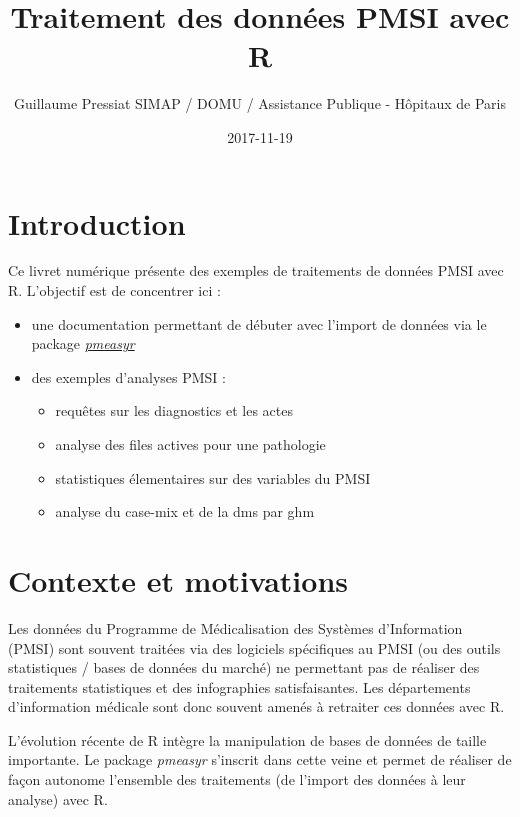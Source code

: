 \documentclass[]{book}
\title{Traitement des données PMSI avec R}
\author{Guillaume Pressiat \textbar{}\textbar{} SIMAP / DOMU / Assistance
Publique - Hôpitaux de Paris}
\date{2017-11-19}
\providecommand{\tightlist}{%
  \setlength{\itemsep}{0pt}\setlength{\parskip}{0pt}}
\theoremstyle{definition}
\theoremstyle{definition}
\theoremstyle{definition}
\theoremstyle{remark}
\begin{document}
\maketitle

{
\setcounter{tocdepth}{1}
\tableofcontents
}
\chapter{Introduction}\label{introduction}

Ce livret numérique présente des exemples de traitements de données PMSI
avec R. L'objectif est de concentrer ici :

\begin{itemize}
\item
  une documentation permettant de débuter avec l'import de données via
  le package \href{https://github.com/IM-APHP/pmeasyr}{\emph{pmeasyr}}
\item
  des exemples d'analyses PMSI :

  \begin{itemize}
  \tightlist
  \item
    requêtes sur les diagnostics et les actes
  \item
    analyse des files actives pour une pathologie
  \item
    statistiques élementaires sur des variables du PMSI
  \item
    analyse du case-mix et de la dms par ghm
  \end{itemize}
\end{itemize}

\chapter{Contexte et motivations}\label{contexte}

Les données du Programme de Médicalisation des Systèmes d'Information
(PMSI) sont souvent traitées via des logiciels spécifiques au PMSI (ou
des outils statistiques / bases de données du marché) ne permettant pas
de réaliser des traitements statistiques et des infographies
satisfaisantes. Les départements d'information médicale sont donc
souvent amenés à retraiter ces données avec R.

L'évolution récente de R intègre la manipulation de bases de données de
taille importante. Le package \emph{pmeasyr} s'inscrit dans cette veine
et permet de réaliser de façon autonome l'ensemble des traitements (de
l'import des données à leur analyse) avec R.
\end{document}
